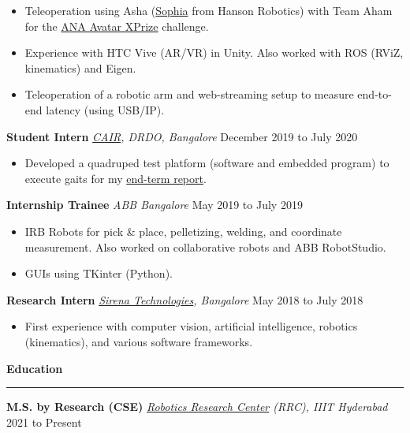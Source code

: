\documentclass{article}
\newcommand{\newsec}[1]{
    {\bf \large #1}
    \vspace{2mm}
    \hrule
    \vspace{2mm}
}
\newcommand{\expheader}[3]{
    {\bf #1} \hfill {\it #2} \hfill #3
}
\begin{document}
    \begin{itemize}
        \setlength{\itemsep}{0mm}
        \item Teleoperation using Asha (\href{
            https://www.hansonrobotics.com/sophia/}{Sophia} from 
            Hanson Robotics) with Team Aham for the \href{
            https://avatar.xprize.org/prizes/avatar}{ANA Avatar 
            XPrize} challenge.
        \item Experience with HTC Vive (AR/VR) in Unity. Also worked
            with ROS (RViZ, kinematics) and Eigen.
        \item Teleoperation of a robotic arm and web-streaming setup
            to measure end-to-end latency (using USB/IP).
    \end{itemize}
    \expheader{Student Intern}{
        \href{https://www.drdo.gov.in/drdo/labs-and-establishments/centre-artificial-intelligence-robotics-cair}{CAIR}, 
        DRDO, Bangalore}{December 2019 to July 2020}
    \begin{itemize}
        \setlength{\itemsep}{0mm}
        \item Developed a quadruped test platform (software and
            embedded program) to execute gaits for my
            \href{https://www.dropbox.com/scl/fi/ntwybuhk6n4kn3bfkkesc/BTech-Mechatronics-Endterm-Report.pdf?rlkey=buo9s7dxvl8ohvdv8dr28wf5v&dl=0}{end-term
            report}.
    \end{itemize}
    \expheader{Internship Trainee}{ABB Bangalore}{May 2019 to July 
        2019}
    \begin{itemize}
        \setlength{\itemsep}{0mm}
        \item IRB Robots for pick \& place, pelletizing, welding, and
            coordinate measurement. Also worked on collaborative
            robots and ABB RobotStudio.
        \item GUIs using TKinter (Python).
    \end{itemize}
    \expheader{Research Intern}{\href{https://sirenatech.com/}{Sirena
        Technologies}, Bangalore}{May 2018 to July 2018}
    \begin{itemize}
        \setlength{\itemsep}{0mm}
        \item First experience with computer vision, artificial 
            intelligence, robotics (kinematics), and various software 
            frameworks.
    \end{itemize}
    \newsec{Education}
    \expheader{M.S. by Research (CSE)}{\href{
        https://robotics.iiit.ac.in/}{Robotics Research Center} (RRC), 
        IIIT Hyderabad}{2021 to Present}
\end{document}
